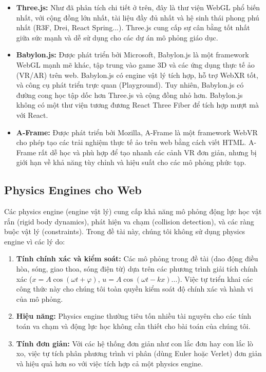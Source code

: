 \begin{itemize}
    \item \textbf{Three.js:} Như đã phân tích chi tiết ở trên, đây là thư viện WebGL phổ biến nhất, với cộng đồng lớn nhất, tài liệu đầy đủ nhất và hệ sinh thái phong phú nhất (R3F, Drei, React Spring...). Three.js cung cấp sự cân bằng tốt nhất giữa sức mạnh và dễ sử dụng cho các dự án mô phỏng giáo dục.
    
    \item \textbf{Babylon.js:} Được phát triển bởi Microsoft, Babylon.js là một framework WebGL mạnh mẽ khác, tập trung vào game 3D và các ứng dụng thực tế ảo (VR/AR) trên web. Babylon.js có engine vật lý tích hợp, hỗ trợ WebXR tốt, và công cụ phát triển trực quan (Playground). Tuy nhiên, Babylon.js có đường cong học tập dốc hơn Three.js và cộng đồng nhỏ hơn. Babylon.js không có một thư viện tương đương React Three Fiber để tích hợp mượt mà với React.
    
    \item \textbf{A-Frame:} Được phát triển bởi Mozilla, A-Frame là một framework WebVR cho phép tạo các trải nghiệm thực tế ảo trên web bằng cách viết HTML. A-Frame rất dễ học và phù hợp để tạo nhanh các cảnh VR đơn giản, nhưng bị giới hạn về khả năng tùy chỉnh và hiệu suất cho các mô phỏng phức tạp.
\end{itemize}

\subsection{Physics Engines cho Web}

Các physics engine (engine vật lý) cung cấp khả năng mô phỏng động lực học vật rắn (rigid body dynamics), phát hiện va chạm (collision detection), và các ràng buộc vật lý (constraints). Trong đề tài này, chúng tôi không sử dụng physics engine vì các lý do:

\begin{enumerate}
    \item \textbf{Tính chính xác và kiểm soát:} Các mô phỏng trong đề tài (dao động điều hòa, sóng, giao thoa, sóng điện từ) dựa trên các phương trình giải tích chính xác ($x = A\cos(\omega t + \varphi)$, $u = A\cos(\omega t - kx)$...). Việc tự triển khai các công thức này cho chúng tôi toàn quyền kiểm soát độ chính xác và hành vi của mô phỏng.
    \item \textbf{Hiệu năng:} Physics engine thường tiêu tốn nhiều tài nguyên cho các tính toán va chạm và động lực học không cần thiết cho bài toán của chúng tôi.
    \item \textbf{Tính đơn giản:} Với các hệ thống đơn giản như con lắc đơn hay con lắc lò xo, việc tự tích phân phương trình vi phân (dùng Euler hoặc Verlet) đơn giản và hiệu quả hơn so với việc tích hợp cả một physics engine.
\end{enumerate}

